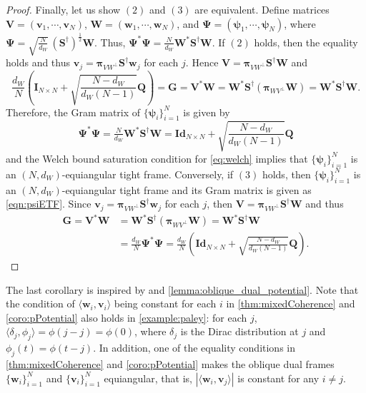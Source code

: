 \documentclass{amsart}
\numberwithin{equation}{section}
\newcommand{\bpi}{{\boldsymbol{\pi}}}
\theoremstyle{plain}
\theoremstyle{remark}
\theoremstyle{definition}
\begin{document}
\begin{proof}
Finally, let us show $(2)$ and $(3)$ are equivalent. Define matrices $\mathbf{V}=(\mathbf{v}_1, \cdots, \mathbf{v}_N)$, $\mathbf{W} = (\mathbf{w}_1, \cdots, \mathbf{w}_N)$, and $\boldsymbol{\Psi} = (\boldsymbol{\psi}_1, \cdots, \boldsymbol{\psi}_N)$, where $\boldsymbol{\Psi} = \sqrt{\tfrac{N}{d_W}} \, (\mathbf{S}^\dagger)^{\frac{1}{2}} \mathbf{W}$. Thus, $\boldsymbol{\Psi}^* \boldsymbol{\Psi} = \tfrac{N}{d_W}  \mathbf{W}^* \mathbf{S}^\dagger \mathbf{W}$. If $(2)$ holds, then the equality holds and thus $\mathbf{v}_j = \bpi_{VW^\perp} \mathbf{S}^\dagger \mathbf{w}_j$ for each $j$. Hence  $\mathbf{V} = \bpi_{V W^\perp} \mathbf{S}^{\dagger}\mathbf{W} $ and
\begin{equation*}
    \frac{d_W}{N} \left(\mathbf{I}_{N \times N} + \sqrt{\frac{N-d_W}{d_W(N-1)}}\mathbf{Q}\right) = \mathbf{G} = \mathbf{V}^*\mathbf{W}  = \mathbf{W}^* \mathbf{S}^{\dagger} (\bpi_{W V^\perp}\mathbf{W})  = \mathbf{W}^* \mathbf{S}^{\dagger}\mathbf{W}.
    \end{equation*}
Therefore, the Gram matrix of $\{\boldsymbol{\psi}_i\}_{i=1}^N $ is given by
\begin{equation}\label{eqn:psiETF}
    \boldsymbol{\Psi}^* \boldsymbol{\Psi} = \tfrac{N}{d_W}  \mathbf{W}^* \mathbf{S}^\dagger \mathbf{W} = \mathbf{Id}_{N \times N} + \sqrt{\frac{N-d_W}{d_W(N-1)}}\mathbf{Q}
\end{equation}
and the Welch bound saturation condition for \eqref{eq:welch} implies that $\{\boldsymbol{\psi}_i\}_{i=1}^N$ is an $(N,d_W)$-equiangular tight frame. 
Conversely, if $(3)$ holds, then $\{\boldsymbol{\psi}_i\}_{i=1}^N$ is an $(N,d_W)$-equiangular tight frame and its Gram matrix is given as \cref{eqn:psiETF}. Since $\mathbf{v}_j = \bpi_{VW^\perp} \mathbf{S}^\dagger \mathbf{w}_j$ for each $j$, then  $\mathbf{V} = \bpi_{V W^\perp} \mathbf{S}^{\dagger}\mathbf{W} $ and thus
\begin{equation*}
\begin{split}
     \mathbf{G} = \mathbf{V}^*\mathbf{W} & =  \mathbf{W}^*  \mathbf{S}^{\dagger} (\bpi_{W V^\perp}\mathbf{W}) = \mathbf{W}^* \mathbf{S}^{\dagger}\mathbf{W} \\
     & = \frac{d_W}{N} \boldsymbol{\Psi}^* \boldsymbol{\Psi} =  \frac{d_W}{N} \left(\mathbf{Id}_{N \times N} + \sqrt{\frac{N-d_W}{d_W(N-1)}}\mathbf{Q} \right).
\end{split}
\end{equation*}
\end{proof}




The last corollary is inspired by \cite[Theorem 26]{aceska2022cross} and \cref{lemma:oblique_dual_potential}. Note that the condition of $\langle \mathbf{w}_i, \mathbf{v}_i \rangle$ being constant for each $i$ in \cref{thm:mixedCoherence} and \cref{coro:pPotential} also holds in  \cref{example:paley}: for each $j$,  $\langle \delta_j, \phi_j \rangle = \phi(j-j) = \phi(0)$, where $\delta_j$ is the Dirac distribution at $j$ and $\phi_j(t) = \phi(t-j)$.  In addition, one of the equality conditions in \cref{thm:mixedCoherence} and \cref{coro:pPotential} makes the oblique dual frames $\{\mathbf{w}_i\}_{i=1}^N$ and $\{\mathbf{v}_i\}_{i=1}^N$ equiangular, that is, $|\langle \mathbf{w}_i, \mathbf{v}_j \rangle |$ is constant for any $i \neq j$.
\end{document}

